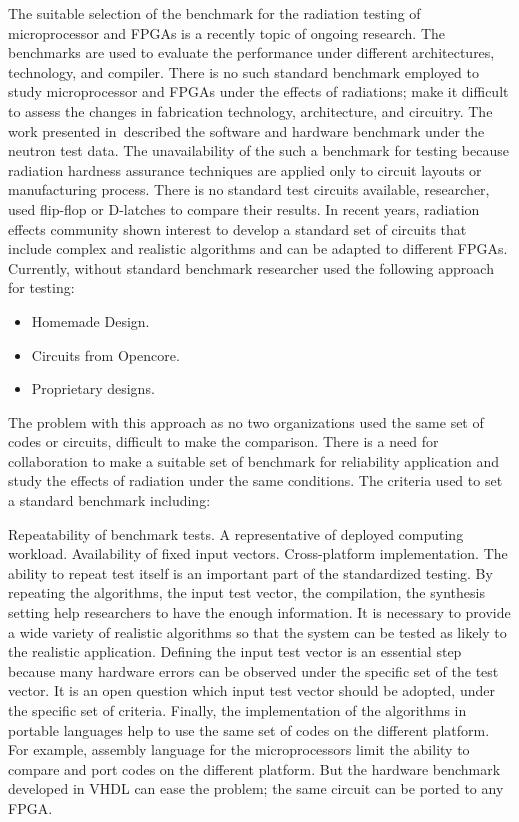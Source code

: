 The suitable selection of the benchmark for the radiation testing of microprocessor and FPGAs is a recently topic of ongoing research. The benchmarks are used to evaluate the performance under different architectures, technology, and compiler. There is no such standard benchmark employed to study microprocessor and FPGAs under the effects of radiations; make it difficult to assess the changes in fabrication technology, architecture, and circuitry. The work presented in~\cite{quinn2015using}described the software and hardware benchmark under the neutron test data. The unavailability of the such a benchmark for testing because radiation hardness assurance techniques are applied only to circuit layouts or manufacturing process. There is no standard test circuits available, researcher, used flip-flop or D-latches to compare their results. In recent years, radiation effects community shown interest to develop a standard set of circuits that include complex and realistic algorithms and can be adapted to different FPGAs.  Currently, without standard benchmark researcher used the following approach for testing:

\begin{itemize}


\item Homemade Design.
\item Circuits from Opencore.
\item Proprietary designs.
\end{itemize}


The problem with this approach as no two organizations used the same set of codes or circuits, difficult to make the comparison. There is a need for collaboration to make a suitable set of benchmark for reliability application and study the effects of radiation under the same conditions. The criteria used to set a standard benchmark including:

Repeatability of benchmark tests.
A representative of deployed computing workload.
Availability of fixed input vectors.
Cross-platform implementation.
The ability to repeat test itself is an important part of the standardized testing. By repeating the algorithms, the input test vector, the compilation, the synthesis setting help researchers to have the enough information. It is necessary to provide a wide variety of realistic algorithms so that the system can be tested as likely to the realistic application. Defining the input test vector is an essential step because many hardware errors can be observed under the specific set of the test vector. It is an open question which input test vector should be adopted, under the specific set of criteria. Finally, the implementation of the algorithms in portable languages help to use the same set of codes on the different platform. For example, assembly language for the microprocessors limit the ability to compare and port codes on the different platform. But the hardware benchmark developed in VHDL can ease the problem; the same circuit can be ported to any FPGA.


